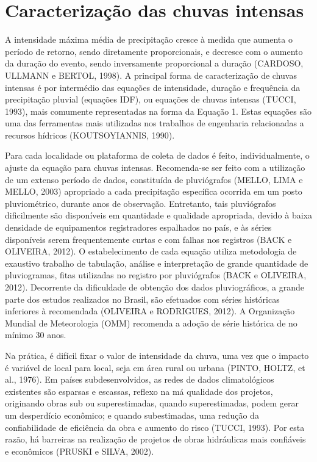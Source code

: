 \section{Caracterização das chuvas intensas}

A intensidade máxima média de precipitação cresce à medida que aumenta o período de retorno, sendo diretamente proporcionais, e decresce com o aumento da duração do evento, sendo inversamente proporcional a duração (CARDOSO, ULLMANN e BERTOL, 1998). A principal forma de caracterização de chuvas intensas é por intermédio das equações de intensidade, duração e frequência da precipitação pluvial (equações IDF), ou equações de chuvas intensas (TUCCI, 1993), mais comumente representadas na forma da Equação 1. Estas equações são uma das ferramentas mais utilizadas nos trabalhos de engenharia relacionadas a recursos hídricos (KOUTSOYIANNIS, 1990).

Para cada localidade ou plataforma de coleta de dados é feito, individualmente, o ajuste da equação para chuvas intensas. Recomenda-se ser feito com a utilização de um extenso período de dados, constituída de pluviógrafos (MELLO, LIMA e MELLO, 2003) apropriado a cada precipitação específica ocorrida em um posto pluviométrico, durante anos de observação. Entretanto, tais pluviógrafos dificilmente são disponíveis em quantidade e qualidade apropriada, devido à baixa densidade de equipamentos registradores espalhados no país, e às séries disponíveis serem frequentemente curtas e com falhas nos registros (BACK e OLIVEIRA, 2012).
O estabelecimento de cada equação utiliza metodologia de exaustivo trabalho de tabulação, análise e interpretação de grande quantidade de pluviogramas, fitas utilizadas no registro por pluviógrafos (BACK e OLIVEIRA, 2012). 
Decorrente da dificuldade de obtenção dos dados pluviográficos, a grande parte dos estudos realizados no Brasil, são efetuados com séries históricas inferiores à recomendada (OLIVEIRA e RODRIGUES, 2012). A Organização Mundial de Meteorologia (OMM) recomenda a adoção de série histórica de no mínimo 30 anos.

Na prática, é difícil fixar o valor de intensidade da chuva, uma vez que o impacto é variável de local para local, seja em área rural ou urbana (PINTO, HOLTZ, et al., 1976). Em países subdesenvolvidos, as redes de dados climatológicos existentes são esparsas e escassas, reflexo na má qualidade dos projetos, originando obras sub ou superestimadas, quando superestimadas, podem gerar um desperdício econômico; e quando subestimadas, uma redução da confiabilidade de eficiência da obra e aumento do risco (TUCCI, 1993). Por esta razão, há barreiras na realização de projetos de obras hidráulicas mais confiáveis e econômicos (PRUSKI e SILVA, 2002). 

